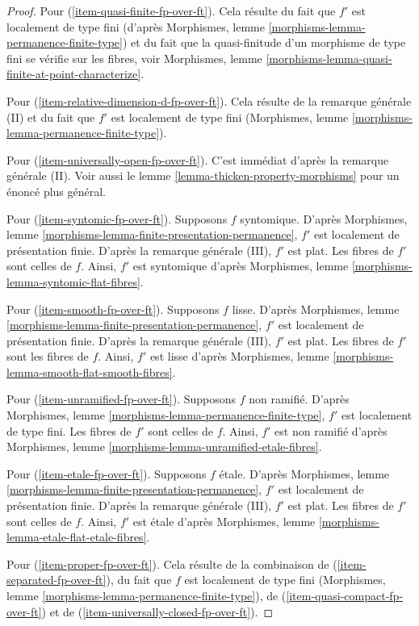 \begin{proof}
\medskip\noindent
Pour (\ref{item-quasi-finite-fp-over-ft}). Cela résulte du fait que $f'$
est localement de type fini
(d'après Morphismes, lemme \ref{morphisms-lemma-permanence-finite-type}) et du fait que
la quasi-finitude d'un morphisme de type fini se vérifie sur les fibres, voir
Morphismes, lemme \ref{morphisms-lemma-quasi-finite-at-point-characterize}.

\medskip\noindent
Pour (\ref{item-relative-dimension-d-fp-over-ft}).
Cela résulte de la remarque générale (II) et du fait que $f'$
est localement de type fini
(Morphismes, lemme \ref{morphisms-lemma-permanence-finite-type}).

\medskip\noindent
Pour (\ref{item-universally-open-fp-over-ft}).
C'est immédiat d'après la remarque générale (II). Voir aussi
le lemme \ref{lemma-thicken-property-morphisms} pour un énoncé plus général.

\medskip\noindent
Pour (\ref{item-syntomic-fp-over-ft}). Supposons $f$ syntomique. D'après
Morphismes, lemme \ref{morphisms-lemma-finite-presentation-permanence},
$f'$ est localement de présentation finie.
D'après la remarque générale (III), $f'$ est plat. Les fibres de $f'$ sont celles
de $f$. Ainsi, $f'$ est syntomique d'après
Morphismes, lemme \ref{morphisms-lemma-syntomic-flat-fibres}.

\medskip\noindent
Pour (\ref{item-smooth-fp-over-ft}). Supposons $f$ lisse. D'après
Morphismes, lemme \ref{morphisms-lemma-finite-presentation-permanence},
$f'$ est localement de présentation finie.
D'après la remarque générale (III), $f'$ est plat. Les fibres de $f'$ sont les
fibres de $f$. Ainsi, $f'$ est lisse d'après
Morphismes, lemme \ref{morphisms-lemma-smooth-flat-smooth-fibres}.

\medskip\noindent
Pour (\ref{item-unramified-fp-over-ft}). Supposons $f$ non ramifié. D'après
Morphismes, lemme \ref{morphisms-lemma-permanence-finite-type},
$f'$ est localement de type fini. Les fibres de $f'$ sont celles de $f$.
Ainsi, $f'$ est non ramifié d'après
Morphismes, lemme \ref{morphisms-lemma-unramified-etale-fibres}.

\medskip\noindent
Pour (\ref{item-etale-fp-over-ft}). Supposons $f$ étale. D'après
Morphismes, lemme \ref{morphisms-lemma-finite-presentation-permanence},
$f'$ est localement de présentation finie.
D'après la remarque générale (III), $f'$ est plat.
Les fibres de $f'$ sont celles de $f$. Ainsi, $f'$ est étale d'après
Morphismes, lemme \ref{morphisms-lemma-etale-flat-etale-fibres}.

\medskip\noindent
Pour (\ref{item-proper-fp-over-ft}). Cela résulte de la combinaison de
(\ref{item-separated-fp-over-ft}), du fait que $f$ est localement
de type fini (Morphismes, lemme \ref{morphisms-lemma-permanence-finite-type}),
de (\ref{item-quasi-compact-fp-over-ft})
et de (\ref{item-universally-closed-fp-over-ft}).


\end{proof}
